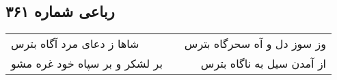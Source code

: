 \begin{center}
\section*{رباعی شماره ۳۶۱}
\label{sec:sh361}
\begin{longtable}{l p{0.5cm} r}
شاها ز دعای مرد آگاه بترس
&&
وز سوز دل و آه سحرگاه بترس
\\
بر لشکر و بر سپاه خود غره مشو
&&
از آمدن سیل به ناگاه بترس
\\
\end{longtable}
\end{center}
